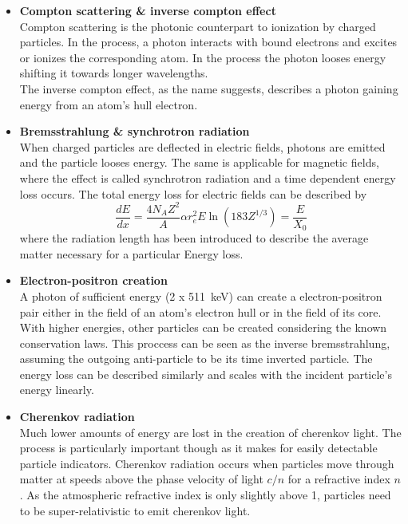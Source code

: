 \begin{itemize}
\begin{itemize}
		\item{\bf Compton scattering \& inverse compton effect}\\
		Compton scattering is the photonic counterpart to ionization by charged particles. In the process, a photon interacts with bound electrons and excites or ionizes the corresponding atom. In the process the photon looses energy shifting it towards longer wavelengths.\\
		The inverse compton effect, as the name suggests, describes a photon gaining energy from an atom's hull electron.
		
		\item{\bf Bremsstrahlung \& synchrotron radiation}\\
		When charged particles are deflected in electric fields, photons are emitted and the particle looses energy. The same is applicable for magnetic fields, where the effect is called synchrotron radiation and a time dependent energy loss occurs. The total energy loss for electric fields can be described by
		\begin{equation}
			\frac{dE}{dx} = \frac{4N_AZ^2}{A}\alpha r_e^2 E  \ln{\left(183 Z^{1/3}\right)} = \frac{E}{X_0}
		\end{equation}
		where the radiation length has been introduced to describe the average matter necessary for a particular Energy loss.
		
		\item{\bf Electron-positron creation}\\
		A photon of sufficient energy (2 x \SI{511}{\kilo\electronvolt}) can create a electron-positron pair either in the field of an atom's electron hull or in the field of its core. With higher energies, other particles can be created considering the known conservation laws. 
		This proccess can be seen as the inverse bremsstrahlung, assuming the outgoing anti-particle to be its time inverted particle. The energy loss can be described similarly and scales with the incident particle's energy linearly.

		\item{\bf Cherenkov radiation}\\
		Much lower amounts of energy are lost in the creation of cherenkov light. The process is particularly important though as it makes for easily detectable particle indicators. Cherenkov radiation occurs when particles move through matter at speeds above the phase velocity of light $c/n$ for a refractive index $n$. As the atmospheric refractive index is only slightly above 1, particles need to be super-relativistic to emit cherenkov light. 		
    \end{itemize}
    \end{itemize}
